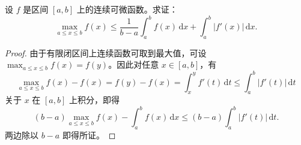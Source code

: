 \documentclass[../../main.tex]{subfiles}
\begin{document}
\begin{example}
设 \( f \) 是区间 \([a,b]\) 上的连续可微函数。求证：
\[
\max_{a\leqslant x\leqslant b} f(x)\leqslant \frac{1}{b-a}\int_a^b{f(x)\,\mathrm{d}x}+\int_a^b{|f' (x)|\,\mathrm{d}x}.
\]
\end{example}
\begin{proof}
由于有限闭区间上连续函数可取到最大值，可设 \( \max_{a \leqslant x \leqslant b} f(x) = f(y) \)。因此对任意 \( x \in [a,b] \)，有
\[
\max_{a \leqslant x \leqslant b} f(x) - f(x) = f(y) - f(x) = \int_{x}^{y} f'(t) \, \mathrm{d}t \leqslant \int_{a}^{b} |f'(t)| \, \mathrm{d}t
\]
关于 \( x \) 在 \([a,b]\) 上积分，即得
\[
(b - a) \max_{a \leqslant x \leqslant b} f(x) - \int_{a}^{b} f(x) \, \mathrm{d}x \leqslant (b-a)\int_{a}^{b} |f'(t)| \, \mathrm{d}t.
\]
两边除以 \( b - a \) 即得所证。

\end{proof}
\end{document}
